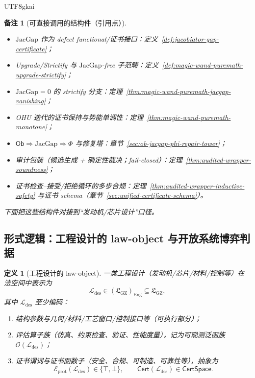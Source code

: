 \documentclass[12pt]{article}
\newtheorem{definition}{定义}[section]
\newtheorem{remark}{备注}[section]
\newcommand{\GZLS}{\ensuremath{\mathfrak{L}_{\mathrm{GZ}}}}
\newcommand{\JacGap}{\ensuremath{\mathrm{JacGap}}} %
\begin{document}
\begin{CJK*}{UTF8}{gkai}
\begin{remark}[可直接调用的结构件（引用点）]
\begin{itemize}
  \item $\JacGap$ 作为 defect functional/证书接口：定义~\ref{def:jacobiator-gap-certificate}；
  \item Upgrade/Strictify 与 $\JacGap$-free 子范畴：定义~\ref{def:magic-wand-puremath-upgrade-strictify}；
  \item $\JacGap=0$ 的 strictify 分支：定理~\ref{thm:magic-wand-puremath-jacgap-vanishing}；
  \item OHU 迭代的证书保持与势能单调性：定理~\ref{thm:magic-wand-puremath-monotone}；
  \item $\mathsf{Ob}\Rightarrow \JacGap \Rightarrow \Phi$ 与修复塔：章节~\ref{sec:ob-jacgap-phi-repair-tower}；
  \item 审计包装（候选生成 + 确定性裁决；fail-closed）：定理~\ref{thm:audited-wrapper-soundness}；
  \item 证书检查--接受/拒绝循环的多步合规：定理~\ref{thm:audited-wrapper-inductive-safety} 与证书 schema（章节~\ref{sec:unified-certificate-schema}）。
\end{itemize}
下面把这些结构件对接到“发动机/芯片设计”口径。
\end{remark}

\subsection{形式逻辑：工程设计的 law-object 与开放系统博弈判据}
\label{sec:eng-design-formal}

\begin{definition}[工程设计的 law-object]
\label{def:eng-design-law-object}
一类工程设计（发动机/芯片/材料/控制等）在法空间中表示为
\[
  \mathcal{L}_{\mathrm{des}}\in(\GZLS)_{\mathrm{Eng}}\subseteq \GZLS,
\]
其中 $\mathcal{L}_{\mathrm{des}}$ 至少编码：
\begin{enumerate}
  \item 结构参数与几何/材料/工艺窗口/控制接口等（可执行部分）；
  \item 评估算子族（仿真、约束检查、验证、性能度量），记为可观测泛函族 $\mathcal{O}(\mathcal{L}_{\mathrm{des}})$；
  \item 证书谓词与证书函数子（安全、合规、可制造、可靠性等），抽象为
  \[
    \mathcal{E}_{\mathrm{prot}}(\mathcal{L}_{\mathrm{des}})\in\{\top,\bot\},
    \qquad
    \mathsf{Cert}(\mathcal{L}_{\mathrm{des}})\in\mathsf{CertSpace}.
  \]
\end{enumerate}
\end{definition}


\end{CJK*}
\end{document}
